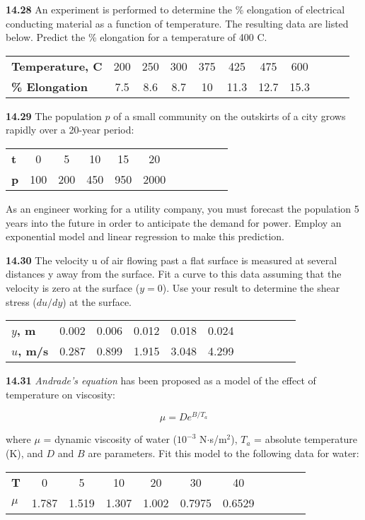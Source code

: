 \documentclass[../main.tex]{subfiles}
\begin{document}
\begin{multicols}{2}
	\noindent\textbf{14.28} An experiment is performed to determine the \% elongation of electrical conducting material as a function of temperature. The resulting data are listed below. Predict the \%
	elongation for a temperature of 400 \textdegree C.

	\noindent \begin{tabular}{l c c c c c c c c c c}
		\textbf{Temperature, \textdegree C} & 200 & 250 & 300 & 375 & 425 & 475 & 600 \\
		\textbf{\% Elongation} & 7.5 & 8.6 & 8.7 & 10 & 11.3 & 12.7 & 15.3
	\end{tabular}

	\noindent\textbf{14.29} The population $p$ of a small community on the outskirts of a city grows rapidly over a 20-year period:

	\noindent \begin{tabular}{l c c c c c c c c c c}
		\textbf{t} & 0 & 5 & 10 & 15 & 20 \\
		\textbf{p} & 100 & 200 & 450 & 950 & 2000
	\end{tabular}

	\noindent As an engineer working for a utility company, you must
	forecast the population 5 years into the future in order to anticipate the demand for power. Employ an exponential
	model and linear regression to make this prediction.

	\noindent\textbf{14.30} The velocity u of air flowing past a flat surface is
	measured at several distances y away from the surface. Fit a
	curve to this data assuming that the velocity is zero at the
	surface ($y = 0$). Use your result to determine the shear stress
	($du/dy$) at the surface.

	\noindent \begin{tabular}{l c c c c c c c c c c}
		\textbf{$y$, m} & 0.002 & 0.006 & 0.012 & 0.018 & 0.024 \\
		\textbf{$u$, m/s} & 0.287 & 0.899 & 1.915 & 3.048 & 4.299
	\end{tabular}

	\noindent\textbf{14.31} \textit{Andrade's equation} has been proposed as a model of the effect of temperature on viscosity:

	$$ \mu = De^{B/T_a}$$

	\noindent where $\mu$ = dynamic viscosity of water ($10^{-3}$ N$\cdot$s/m$^2$), $T_a$ = absolute temperature (K), and $D$ and $B$ are parameters. Fit this model to the following data for water:

	\noindent \begin{tabular}{l c c c c c c c c c c}
		\textbf{T} & 0 & 5 & 10 & 20 & 30 & 40 \\
		\textbf{$\mu$} & 1.787 & 1.519 & 1.307 & 1.002 & 0.7975 & 0.6529
	\end{tabular}


\end{multicols}
\end{document}
